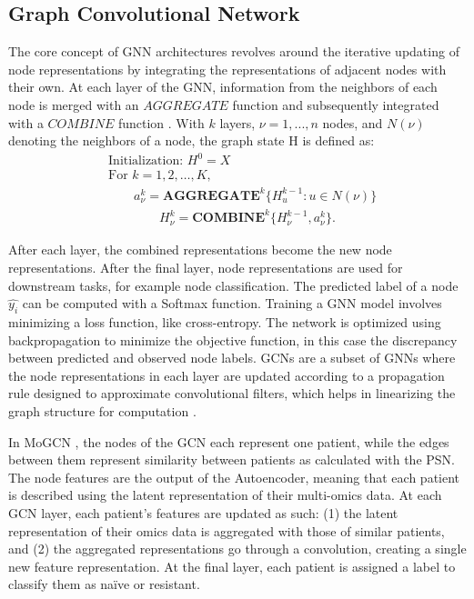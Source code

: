 \documentclass[unnumsec,webpdf,modern,large]{oup-authoring-template}
\theoremstyle{thmstyleone}%
\theoremstyle{thmstyletwo}%
\theoremstyle{thmstylethree}%
\begin{document}
\subsection{Graph Convolutional Network}

The core concept of GNN architectures revolves around the iterative updating of node representations by integrating the representations of adjacent nodes with their own. At each layer of the GNN, information from the neighbors of each node is merged with an $AGGREGATE$ function and subsequently integrated with a $COMBINE$ function \cite{tang2022graph}. With $k$ layers, $\nu = {1, ..., n}$ nodes, and $N(\nu)$ denoting the neighbors of a node, the graph state H is defined as:
\begin{align*}
& \text{Initialization: } H^0 = X \\
& \text{For } k = 1, 2, \ldots, K, \\
& \quad \quad a_{\nu}^{k} = \textbf{AGGREGATE}^k\{H_{u}^{k-1} : u \in N(\nu)\} \\
& \quad \quad \quad \quad H_{\nu}^{k} = \textbf{COMBINE}^k\{H_{\nu}^{k-1}, a_{\nu}^{k}\}.
\end{align*}

After each layer, the combined representations become the new node representations. After the final layer, node representations are used for downstream tasks, for example node classification. The predicted label of a node $\hat{y_i}$ can be computed with a Softmax function. Training a GNN model involves minimizing a loss function, like cross-entropy. The network is optimized using backpropagation to minimize the objective function, in this case the discrepancy between predicted and observed node labels. GCNs are a subset of GNNs where the node representations in each layer are updated according to a propagation rule designed to approximate convolutional filters, which helps in linearizing the graph structure for computation \cite{kipf2016semi}.

\par In MoGCN \cite{Li2022}, the nodes of the GCN each represent one patient, while the edges between them represent similarity between patients as calculated with the PSN. The node features are the output of the Autoencoder, meaning that each patient is described using the latent representation of their multi-omics data. At each GCN layer, each patient's features are updated as such: (1) the latent representation of their omics data is aggregated with those of similar patients, and (2) the aggregated representations go through a convolution, creating a single new feature representation. At the final layer, each patient is assigned a label to classify them as naïve or resistant.
\end{document}
